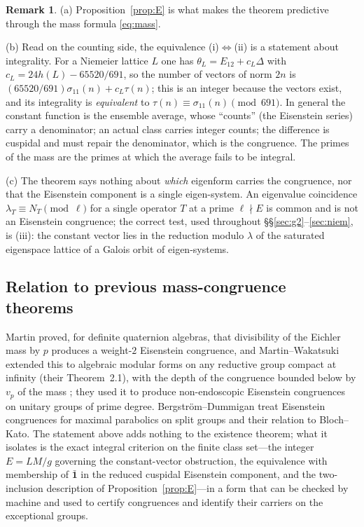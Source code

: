 \documentclass[11pt]{amsart}
\theoremstyle{definition}
\newtheorem{remark}[theorem]{Remark}
\begin{document}
\begin{remark}\label{rem:E}
(a) Proposition~\ref{prop:E} is what makes the theorem predictive through the mass formula \eqref{eq:mass}.

(b) Read on the counting side, the equivalence (i)$\Leftrightarrow$(ii) is a statement about integrality. For a Niemeier lattice $L$ one has $\theta_L=E_{12}+c_L\Delta$ with $c_L=24h(L)-65520/691$, so the number of vectors of norm $2n$ is $(65520/691)\sigma_{11}(n)+c_L\tau(n)$; this is an integer because the vectors exist, and its integrality is \emph{equivalent} to $\tau(n)\equiv\sigma_{11}(n)\pmod{691}$. In general the constant function is the ensemble average, whose ``counts'' (the Eisenstein series) carry a denominator; an actual class carries integer counts; the difference is cuspidal and must repair the denominator, which is the congruence. The primes of the mass are the primes at which the average fails to be integral.

(c) The theorem says nothing about \emph{which} eigenform carries the congruence, nor that the Eisenstein component is a single eigen-system. An eigenvalue coincidence $\lambda_T\equiv N_T\pmod\ell$ for a single operator $T$ at a prime $\ell\nmid E$ is common and is not an Eisenstein congruence; the correct test, used throughout \S\S\ref{sec:g2}--\ref{sec:niem}, is (iii): the constant vector lies in the reduction modulo $\lambda$ of the saturated eigenspace lattice of a Galois orbit of eigen-systems.
\end{remark}

\subsection{Relation to previous mass-congruence theorems} Martin \cite{Mar17} proved, for definite quaternion algebras, that divisibility of the Eichler mass by $p$ produces a weight-$2$ Eisenstein congruence, and Martin--Wakatsuki \cite{MW24} extended this to algebraic modular forms on any reductive group compact at infinity (their Theorem~2.1), with the depth of the congruence bounded below by $v_p$ of the mass \cite{BKK}; they used it to produce non-endoscopic Eisenstein congruences on unitary groups of prime degree. Bergstr\"om--Dummigan \cite{BD} treat Eisenstein congruences for maximal parabolics on split groups and their relation to Bloch--Kato. The statement above adds nothing to the existence theorem; what it isolates is the exact integral criterion on the finite class set---the integer $E=LM/g$ governing the constant-vector obstruction, the equivalence with membership of $\bar{\mathbf 1}$ in the reduced cuspidal Eisenstein component, and the two-inclusion description of Proposition~\ref{prop:E}---in a form that can be checked by machine and used to certify congruences and identify their carriers on the exceptional groups.
\end{document}
